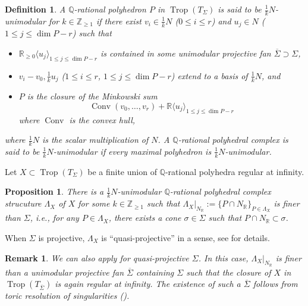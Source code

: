 \documentclass[12pt,a4]{amsart}
\newtheorem{dfn}[thm]{Definition}
\newtheorem{prp}[thm]{Proposition}
\newtheorem{rem}[thm]{Remark}
\def\R{\mathbb{R}}
\def\Z{\mathbb{Z}}
\def\Q{\mathbb{Q}}
\def\Conv{\mathop{\mathrm{Conv}}\nolimits}
\def\Trop{\mathop{\mathrm{trop}}\nolimits}
\def\Trop{\mathop{\mathrm{Trop}}\nolimits}
\numberwithin{equation}{section}
\numberwithin{figure}{section}
\begin{document}
  \begin{dfn}\label{def unimodularity:label}
  A $\Q$-rational polyhedron $P$ 
   in $\Trop (T_{\Sigma})$
   is said to be \emph{$\frac{1}{k}N$-unimodular} for  $k \in \Z_{\geq 1}$ 
    if 
    there exist 
     $v_i \in \frac{1}{k}N $ ($ 0 \leq i \leq r$)
     and $u_j \in N $ ($ 1 \leq j \leq \dim P -r$)
    such that 
    \begin{itemize}
      \item
     $
        \R_{\geq 0}  \langle  u_j \rangle_{ 1 \leq j \leq \dim P - r } $
        is contained in  some unimodular projective fan $\overline{\Sigma} \supset \Sigma$,
     \item
     $ v_i - v_0, \frac{1}{k}u_j $ ($1 \leq i \leq r$, $1 \leq j \leq \dim P -r $)
     extend to a basis of $\frac{1}{k}N$,
     and 
     \item 
    $P$ is the closure of the Minkowski sum
    $$  \Conv (v_0, \dots, v_r) 
    + \R  \langle  u_j \rangle_{ 1 \leq j \leq \dim P - r } $$
    where 
      $\Conv $ is the convex hull, 
    \end{itemize}
    where 
      $\frac{1}{k}N$ is the scalar multiplication of $N$.
  A $\Q$-rational polyhedral complex is 
  said to be $\frac{1}{k}N$-unimodular 
  if every maximal polyhedron is $\frac{1}{k}N$-unimodular.
  \end{dfn}

  Let $X\subset \Trop (T_\Sigma)$ be a finite union of $\Q$-rational polyhedra regular at infinity. 

  \begin{prp}\label{the existence of unimodular triangulation}
   There is a
   $\frac{1}{k}N$-unimodular
    $\Q$-rational polyhedral complex strucuture $\Lambda_X$ 
    of $X$ 
   for some $k \in \Z_{\geq 1}$
   such that 
   $\Lambda_X |_{ N_\R} := \{ P \cap N_\R \}_{ P \in \Lambda_X }$
     is finer than $\Sigma$, 
     i.e., 
     for any $ P \in \Lambda_X$, 
     there exists a cone $\sigma \in \Sigma$ such that 
     $P  \cap N_\R \subset \sigma$.
  \end{prp}

   When $\Sigma$ is projective, 
   $\Lambda_X$ is ``quasi-projective'' in a sense, see  for details. 

  \begin{rem}
   We can also
   apply  
   for quasi-projective $\Sigma$.
   In this case, $\Lambda_X |_{N_\R}$ is finer than 
   a unimodular projective fan $\overline{\Sigma}$ containing $\Sigma$
   such that the closure of $X$ in $\Trop (T_{\overline{\Sigma}})$ is again regular at infinity.
   The existence of such a $\overline{\Sigma}$
   follows from 
   toric resolution of singularities (\cite[Theorem 11.1.9]{CoxaLittleSchenckToricvarieties2011}). 
  \end{rem}
\end{document}
